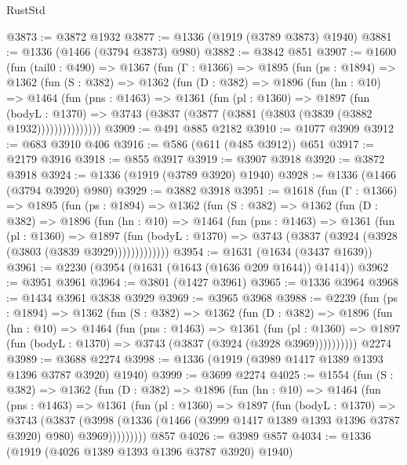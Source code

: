 \begin{lexlean}{RustStd}
\begin{coremodule}
{\begin{coremodule}
{{{{{{{{{{{{{{@3873 := @3872 @1932
@3877 := @1336 (@1919 (@3789 @3873) @1940)
@3881 := @1336 (@1466 (@3794 @3873) @980)
@3882 := @3842 @851
@3907 := @1600
    (fun (tail0 : @490) =>
    @1367
      (fun (Γ : @1366) =>
      @1895
        (fun (ps : @1894) =>
        @1362
          (fun (S : @382) =>
          @1362
            (fun (D : @382) =>
            @1896
              (fun (hn : @10) =>
              @1464
                (fun (pns : @1463) =>
                @1361
                  (fun (pl : @1360) =>
                  @1897
                    (fun (bodyL : @1370) =>
                    @3743 (@3837 (@3877 (@3881 (@3803 (@3839 (@3882 @1932)))))))))))))))
@3909 := @491 @885 @2182
@3910 := @1077 @3909
@3912 := @683 @3910 @406
@3916 := @586 (@611 (@485 @3912)) @651
@3917 := @2179 @3916
@3918 := @855 @3917
@3919 := @3907 @3918
@3920 := @3872 @3918
@3924 := @1336 (@1919 (@3789 @3920) @1940)
@3928 := @1336 (@1466 (@3794 @3920) @980)
@3929 := @3882 @3918
@3951 := @1618
    (fun (Γ : @1366) =>
    @1895
      (fun (ps : @1894) =>
      @1362
        (fun (S : @382) =>
        @1362
          (fun (D : @382) =>
          @1896
            (fun (hn : @10) =>
            @1464
              (fun (pns : @1463) =>
              @1361
                (fun (pl : @1360) =>
                @1897
                  (fun (bodyL : @1370) =>
                  @3743 (@3837 (@3924 (@3928 (@3803 (@3839 @3929)))))))))))))
@3954 := @1631 (@1634 (@3437 @1639))
@3961 := @2230 (@3954 (@1631 (@1643 (@1636 @209 @1644)) @1414))
@3962 := @3951 @3961
@3964 := @3801 (@1427 @3961)
@3965 := @1336 @3964
@3968 := @1434 @3961 @3838 @3929
@3969 := @3965 @3968
@3988 := @2239
    (fun (ps : @1894) =>
    @1362
      (fun (S : @382) =>
      @1362
        (fun (D : @382) =>
        @1896
          (fun (hn : @10) =>
          @1464
            (fun (pns : @1463) =>
            @1361
              (fun (pl : @1360) =>
              @1897 (fun (bodyL : @1370) => @3743 (@3837 (@3924 (@3928 @3969))))))))))
    @2274
@3989 := @3688 @2274
@3998 := @1336 (@1919 (@3989 @1417 @1389 @1393 @1396 @3787 @3920) @1940)
@3999 := @3699 @2274
@4025 := @1554
    (fun (S : @382) =>
    @1362
      (fun (D : @382) =>
      @1896
        (fun (hn : @10) =>
        @1464
          (fun (pns : @1463) =>
          @1361
            (fun (pl : @1360) =>
            @1897
              (fun (bodyL : @1370) =>
              @3743
                (@3837
                  (@3998
                    (@1336 (@1466 (@3999 @1417 @1389 @1393 @1396 @3787 @3920) @980) @3969)))))))))
    @857
@4026 := @3989 @857
@4034 := @1336 (@1919 (@4026 @1389 @1393 @1396 @3787 @3920) @1940)
}}}}}}}}}}}}}}
\end{coremodule}}
\end{coremodule}
\end{lexlean}
